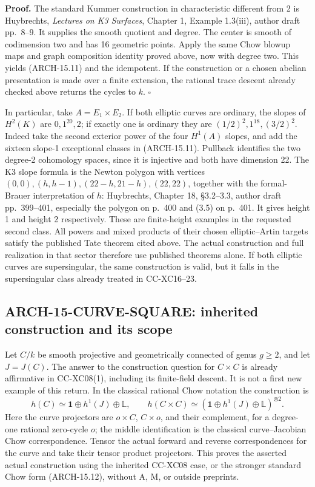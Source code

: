 \textbf{Proof.} The standard Kummer construction in characteristic
different from 2 is Huybrechts, \emph{Lectures on K3 Surfaces}, Chapter
1, Example 1.3(iii), author draft pp.~8--9. It supplies the smooth
quotient and degree. The center is smooth of codimension two and has
16 geometric points. Apply the same Chow blowup maps and graph
composition identity proved above, now with degree two. This yields
(ARCH-15.11) and the idempotent. If the construction or a chosen
abelian presentation is made over a finite extension, the rational
trace descent already checked above returns the cycles to \(k\).
\(\square\)

In particular, take \(A=E_1\times E_2\). If both elliptic curves are
ordinary, the slopes of \(H^2(K)\) are \(0,1^{20},2\); if exactly one
is ordinary they are \((1/2)^2,1^{18},(3/2)^2\). Indeed take the second
exterior power of the four \(H^1(A)\) slopes, and add the sixteen slope-1
exceptional classes in (ARCH-15.11). Pullback identifies the two
degree-2 cohomology spaces, since it is injective and both have
dimension 22. The K3 slope formula is the Newton
polygon with vertices \((0,0),(h,h-1),(22-h,21-h),(22,22)\),
together with the formal-Brauer interpretation of \(h\): Huybrechts,
Chapter 18, \S3.2--3.3, author draft pp.~399--401, especially the
polygon on p.~400 and (3.5) on p.~401. It gives height 1 and height 2 respectively. These are finite-height
examples in the requested second class. All powers and mixed products
of their chosen elliptic--Artin targets satisfy the published Tate
theorem cited above. The actual construction and full realization in
that sector therefore use published theorems alone. If both elliptic
curves are supersingular, the same construction is valid, but it falls
in the supersingular class already treated in CC-XC16--23.

\subsection{ARCH-15-CURVE-SQUARE: inherited construction and its scope}

Let \(C/k\) be smooth projective and geometrically connected of genus
\(g\ge2\), and let \(J=J(C)\). The answer to the construction question
for \(C\times C\) is already affirmative in CC-XC08(1), including its
finite-field descent. It is not a first new example of this return.
In the classical rational Chow notation the construction is
\[
 h(C)\simeq\mathbf1\oplus h^1(J)\oplus\mathbb L,
 \qquad
 h(C\times C)\simeq
 (\mathbf1\oplus h^1(J)\oplus\mathbb L)^{\otimes2}.
 \tag{ARCH-15.12}
\]
Here the curve projectors are \(o\times C\), \(C\times o\), and their
complement, for a degree-one rational zero-cycle \(o\); the middle
identification is the classical curve--Jacobian Chow correspondence.
Tensor the actual forward and reverse correspondences for the curve
and take their tensor product projectors. This proves the asserted
actual construction using the inherited CC-XC08 case, or the stronger
standard Chow form (ARCH-15.12), without A, M, or outside preprints.

